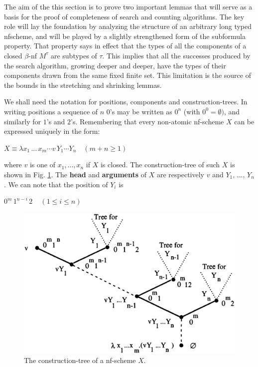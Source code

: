 \documentclass[a4paper,10pt]{article}
\begin{document}
The aim of the this section is to prove two important lemmas that will serve as a basis for the proof of completeness of search and 
counting algorithms. The key role will lay the foundation by analyzing the structure of an arbitrary long typed nfscheme, and
will be played by a slightly strengthened form of the subformula property. That property says in effect that the types of all the components
of a closed $\beta$-nf $M^{\tau}$ are subtypes of $\tau$. This implies that all the successes
produced by the search algorithm, growing deeper and deeper, have the types of
their components drawn from the same fixed finite set. This limitation is the source
of the bounds in the stretching and shrinking lemmas.

We shall need the notation for positions, components and construction-trees. In writing positions a 
sequence of $n$ $0$'s may be written as $0^n$ (with $0^0 = \emptyset)$, and similarly for $1$'s and $2$'s.
Remembering that every non-atomic nf-scheme $X$ can be expressed uniquely in the form:
\begin{center}
 $X \equiv \lambda x_1\, ...\, x_m \cdots v\,Y_1 \cdots Y_n\,\,\,\,\,\, (m + n \geq 1)$
\end{center}
where $v$ is one of $x_1, ..., x_n$ if $X$ is closed. The construction-tree of such $X$ is shown in Fig. \ref{Fig3}. The 
\textbf{head} and \textbf{arguments} of $X$ are respectively $v$ and $Y_1,\,...,\,Y_n$. We can note that the position of $Y_i$ is
\begin{center}
 $0^m\,1^{n - i}\,2\,\,\,\,\,\,\,(1\leq i\leq n)$
\end{center}

\begin{figure}[h]
   \centering
   \includegraphics[scale=0.5]{fig3.png}
   \caption{The construction-tree of a nf-scheme $X$.}
   \label{Fig3}
\end{figure}
\end{document}
